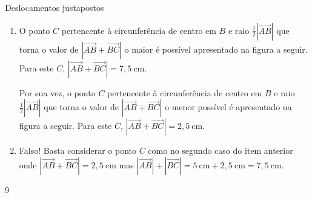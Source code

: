 \begin{answer}{Deslocamentos justapostos}
{\begin{enumerate}
\item {} 
O ponto \(C\) pertencente à circunferência de centro em \(B\) e raio \(\frac{1}{2} |\overrightarrow{AB}|\) que torna o valor de \(|\overrightarrow{AB} + \overrightarrow{BC}|\) o maior é possível apresentado na figura a seguir. Para este \(C\), \(|\overrightarrow{AB} + \overrightarrow{BC}| = 7{,}5~\text{cm}\).
\begin{center}\end{center}
Por sua vez, o ponto \(C\) pertencente à circunferência de centro em \(B\) e raio \(\frac{1}{2} |\overrightarrow{AB}|\) que torna o valor de \(|\overrightarrow{AB} + \overrightarrow{BC}|\) o menor possível é apresentado na figura a seguir. Para este \(C\), \(|\overrightarrow{AB} + \overrightarrow{BC}| = 2{,}5~\text{cm}\).
\begin{center}\end{center}
\item {} 
Falso! Basta considerar o ponto \(C\) como no segundo caso do item anterior onde \(|\overrightarrow{AB} + \overrightarrow{BC}| = 2{,}5~\text{cm}\) mas \(|\overrightarrow{AB}| + |\overrightarrow{BC}| = 5~\text{cm} + 2{,}5~\text{cm} = 7{,}5~\text{cm}\).

\end{enumerate}
}{9}
\end{answer}

